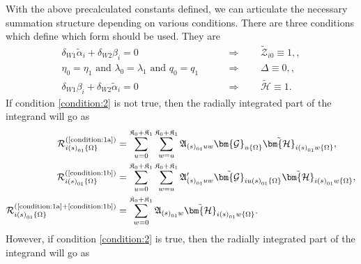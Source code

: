 With the above precalculated constants defined, we can articulate the necessary
summation structure depending on various conditions. There are three conditions
which define which form should be used. They are
\begin{align}
    \delta_{W1}\tilde{\alpha}_{i} + \delta_{W2}\beta_{i} = 0
    \quad\quad &\Rightarrow \quad\quad
    \tilde{\mathcal{Z}}_{i0} \equiv 1,
\label{condition:1a}\tag{C1a}
,\\
    \eta_{0} = \eta_{1}
    \text{ and }
    \lambda_{0} = \lambda_{1}
    \text{ and }
    q_{0} = q_{1}
    \quad\quad &\Rightarrow \quad\quad
    \Delta \equiv 0,
\label{condition:1b}\tag{C1b}
,\\
    \delta_{W1}\beta_{i} + \delta_{W2}\tilde{\alpha}_{i} = 0
    \quad\quad &\Rightarrow \quad\quad
    \tilde{\mathcal{H}} \equiv 1
\label{condition:2}\tag{C2}
.
\end{align}
If condition \eqref{condition:2} is not true, then the radially integrated part
of the integrand will go as
\begin{align}
\mathcal{R}
_{i\left(s\right)_{01}\left\{\Omega\right\}}
^{\left(\text{\ref{condition:1a}}\right)}
    &=
        \sum_{u=0}^{\mathfrak{K}_{0}+\mathfrak{K}_{1}}
        \sum_{w=u}^{\mathfrak{K}_{0}+\mathfrak{K}_{1}}
        \mathfrak{A}_{\left(s\right)_{01}uw}
        \bm{\mathcal{G}}_{u\left\{\Omega\right\}}
        \tilde{\bm{\mathcal{H}}}_{i\left(s\right)_{01}w\left\{\Omega\right\}}
,\\
\mathcal{R}
_{i\left(s\right)_{01}\left\{\Omega\right\}}
^{\left(\text{\ref{condition:1b}}\right)}
    &=
        \sum_{u=0}^{\mathfrak{K}_{0}+\mathfrak{K}_{1}}
        \sum_{w=u}^{\mathfrak{K}_{0}+\mathfrak{K}_{1}}
        \mathfrak{A}_{\left(s\right)_{01}uw}^{\prime}
        \tilde{\bm{\mathcal{G}}}_{iu\left(s\right)_{01}\left\{\Omega\right\}}
        \tilde{\bm{\mathcal{H}}}_{i\left(s\right)_{01}w\left\{\Omega\right\}}
,\\
\mathcal{R}
_{i\left(s\right)_{01}\left\{\Omega\right\}}
^{\left(\text{\ref{condition:1a}}+\text{\ref{condition:1b}}\right)}
    &=
        \sum_{w=0}^{\mathfrak{K}_{0}+\mathfrak{K}_{1}}
        \mathfrak{A}_{\left(s\right)_{01}w}
        \tilde{\bm{\mathcal{H}}}_{i\left(s\right)_{01}w\left\{\Omega\right\}}
.
\end{align}
However, if condition \eqref{condition:2} is true, then the radially integrated
part of the integrand will go as
